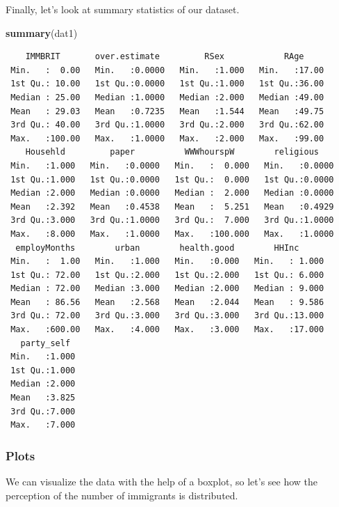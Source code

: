 \documentclass[]{article}
\newenvironment{Shaded}{\begin{snugshade}}{\end{snugshade}}
\newcommand{\CommentTok}[1]{\textcolor[rgb]{0.56,0.35,0.01}{\textit{#1}}}
\newcommand{\DataTypeTok}[1]{\textcolor[rgb]{0.13,0.29,0.53}{#1}}
\newcommand{\KeywordTok}[1]{\textcolor[rgb]{0.13,0.29,0.53}{\textbf{#1}}}
\newcommand{\NormalTok}[1]{#1}
\newcommand{\OperatorTok}[1]{\textcolor[rgb]{0.81,0.36,0.00}{\textbf{#1}}}
\newcommand{\OtherTok}[1]{\textcolor[rgb]{0.56,0.35,0.01}{#1}}
\newcommand{\StringTok}[1]{\textcolor[rgb]{0.31,0.60,0.02}{#1}}
\begin{document}
Finally, let's look at summary statistics of our dataset.

\begin{Shaded}
\begin{Highlighting}[]
\KeywordTok{summary}\NormalTok{(dat1)}
\end{Highlighting}
\end{Shaded}

\begin{verbatim}
    IMMBRIT       over.estimate         RSex            RAge      
 Min.   :  0.00   Min.   :0.0000   Min.   :1.000   Min.   :17.00  
 1st Qu.: 10.00   1st Qu.:0.0000   1st Qu.:1.000   1st Qu.:36.00  
 Median : 25.00   Median :1.0000   Median :2.000   Median :49.00  
 Mean   : 29.03   Mean   :0.7235   Mean   :1.544   Mean   :49.75  
 3rd Qu.: 40.00   3rd Qu.:1.0000   3rd Qu.:2.000   3rd Qu.:62.00  
 Max.   :100.00   Max.   :1.0000   Max.   :2.000   Max.   :99.00  
    Househld         paper          WWWhourspW        religious     
 Min.   :1.000   Min.   :0.0000   Min.   :  0.000   Min.   :0.0000  
 1st Qu.:1.000   1st Qu.:0.0000   1st Qu.:  0.000   1st Qu.:0.0000  
 Median :2.000   Median :0.0000   Median :  2.000   Median :0.0000  
 Mean   :2.392   Mean   :0.4538   Mean   :  5.251   Mean   :0.4929  
 3rd Qu.:3.000   3rd Qu.:1.0000   3rd Qu.:  7.000   3rd Qu.:1.0000  
 Max.   :8.000   Max.   :1.0000   Max.   :100.000   Max.   :1.0000  
  employMonths        urban        health.good        HHInc       
 Min.   :  1.00   Min.   :1.000   Min.   :0.000   Min.   : 1.000  
 1st Qu.: 72.00   1st Qu.:2.000   1st Qu.:2.000   1st Qu.: 6.000  
 Median : 72.00   Median :3.000   Median :2.000   Median : 9.000  
 Mean   : 86.56   Mean   :2.568   Mean   :2.044   Mean   : 9.586  
 3rd Qu.: 72.00   3rd Qu.:3.000   3rd Qu.:3.000   3rd Qu.:13.000  
 Max.   :600.00   Max.   :4.000   Max.   :3.000   Max.   :17.000  
   party_self   
 Min.   :1.000  
 1st Qu.:1.000  
 Median :2.000  
 Mean   :3.825  
 3rd Qu.:7.000  
 Max.   :7.000  
\end{verbatim}

\hypertarget{plots}{%
\subsubsection{Plots}\label{plots}}

We can visualize the data with the help of a boxplot, so let's see how the perception of the number of immigrants is distributed.

\begin{Shaded}
\end{Shaded}
\end{document}
